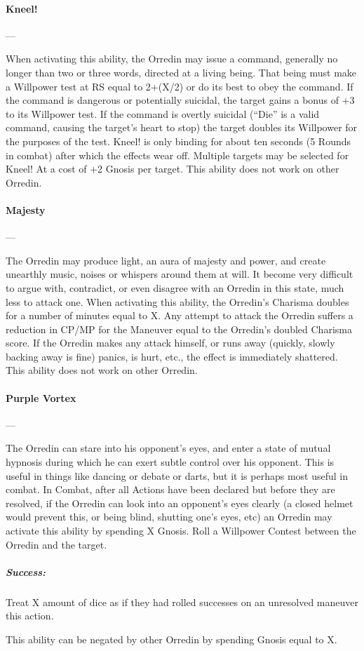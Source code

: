\documentclass[oneside,11pt,english]{book}
\begin{document}
\paragraph{\large Kneel!}\label{man:Kneel!}
---\quad{\large[X]}\par
When activating this ability, the Orredin may issue a command, generally no
longer than two or three words, directed at a living being. That being must make
a Willpower test at RS equal to 2+(X/2) or do its best to obey the command. If
the command is dangerous or potentially suicidal, the target gains a bonus of +3
to its Willpower test. If the command is overtly suicidal (“Die” is a valid
command, causing the target’s heart to stop) the target doubles its Willpower
for the purposes of the test. Kneel! is only binding for about ten seconds (5
Rounds in combat) after which the effects wear off. Multiple targets may be
selected for Kneel! At a cost of +2 Gnosis per target. This ability does not
work on other Orredin.  


\paragraph{\large\label{man:Majesty}Majesty}---\quad{\large[X]}\par
The Orredin may produce light, an aura of majesty and power, and create unearthly music, noises or 
whispers around them at will. It become very difficult to argue with, contradict, or even disagree with an 
Orredin in this state, much less to attack one. When activating this ability,
the Orredin's Charisma doubles for a number of minutes equal to X. Any attempt
to attack the Orredin suffers a reduction in CP/MP for the Maneuver equal to the
Orredin's doubled Charisma score. If the Orredin makes any attack himself, or
runs away (quickly, slowly backing away is fine) panics, is hurt, etc., the
effect is immediately shattered. This ability does not work on other Orredin.  


\paragraph{\large\label{man:Purple Vortex}Purple Vortex}---\quad{\large[X]}\par
The Orredin can stare into his opponent’s eyes, and enter a state of mutual hypnosis during which he can exert subtle control over his opponent. This is useful in things like dancing or debate or darts, but it is perhaps most useful in combat. 
In Combat, after all Actions have been declared but before they are resolved, if the Orredin can look into 
an opponent’s eyes clearly (a closed helmet would prevent this, or being blind, shutting one’s eyes, etc) 
an Orredin may activate this ability by spending X Gnosis. Roll a Willpower Contest between the Orredin and the target.
\vspace*{-15pt}\subparagraph{Success:} Treat X amount of dice as if they had rolled successes on an unresolved maneuver this action.\par
This ability can be negated by other Orredin by spending Gnosis equal to X.
\end{document}
